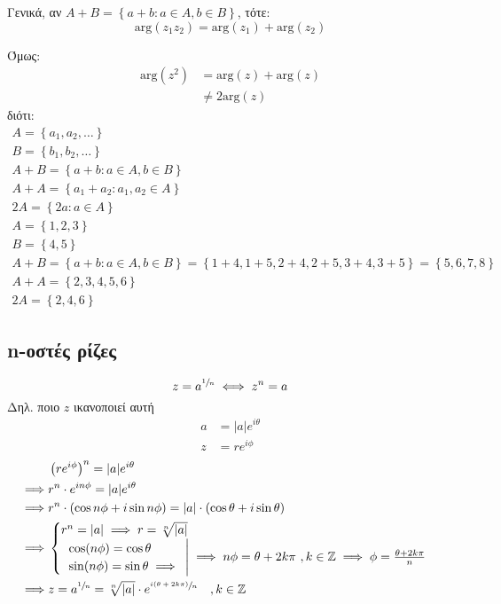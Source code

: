 \documentclass[12pt,a4paper,notitlepage,fleqn]{article}
\begin{document}
    Γενικά, αν \( A+B = \left\lbrace a+b: a \in A, b \in B \right\rbrace \), τότε:
    \[
    \mathrm{arg}(z_1z_2) = \mathrm{arg}(z_1) + \mathrm{arg}(z_2)
    \]

    Όμως:
    \begin{align*}
    \mathrm{arg}(z^2) &= \mathrm{arg}(z)+\mathrm{arg}(z) \\
    &\neq 2\mathrm{arg}(z)
    \end{align*}
    διότι:
    \begin{gather*}
    	A = \left\lbrace a_1,a_2,\dots \right\rbrace \\
    	B = \left\lbrace b_1,b_2,\dots \right\rbrace \\
    	A+B = \left\lbrace a+b: a\in A, b\in B \right\rbrace \\
    	A+A = \left\lbrace a_1+a_2:a_1,a_2\in A \right\rbrace \\
    	2A = \left\lbrace 2a:a\in A \right\rbrace \\[.3pt]
    	A = \left\lbrace 1,2,3 \right\rbrace \\
    	B = \left\lbrace 4,5 \right\rbrace \\
    	A+B = \left\lbrace a+b:a\in A, b\in B \right\rbrace
    	= \left\lbrace 1+4,1+5,2+4,2+5,3+4,3+5 \right\rbrace
    	= \left\lbrace 5,6,7,8 \right\rbrace\\
    	A+A = \left\lbrace 2,3,4,5,6 \right\rbrace \\
    	2A = \left\lbrace 2,4,6 \right\rbrace
    \end{gather*}


   	\subsection{n-οστές ρίζες}
   	\[
   	z = a^{\sfrac{1}{n}} \iff z^n=a
   	\]
   	Δηλ. ποιο \( z \) ικανοποιεί αυτή
   	\begin{align*}
   	a &= |a|e^{i\theta} \\
   	z &= re^{i\phi}
   	\end{align*}
   	\begin{align*}
   	& \left( re^{i\phi} \right)^n = |a|e^{i\theta} \\
   	\implies& r^n\cdot e ^{in\phi} = |a|e^{i\theta} \\
   	\implies& r^n\cdot(\cos n\phi+i\sin n\phi) = |a|\cdot(\cos\theta+i\sin\theta)\\
   	\implies& \begin{cases}
   	r^n=|a|\implies r =\sqrt[n]{|a|} \\
   	\left.\begin{array}{l}
   	\cos(n\phi)=\cos\theta \\
   	\sin(n\phi)=\sin\theta \implies
   	\end{array}\right| \implies
   	n\phi = \theta+2k\pi \ ,k\in\mathbb Z \implies \phi=\frac{\theta+2k\pi}{n}
   	\end{cases} \\
   	\implies& z=a^{\sfrac{1}{n}} = \sqrt[n]{|a|}\cdot
   	e^{\sfrac{i(\theta+2k\pi)}{n}} \quad ,k\in\mathbb Z
   	\end{align*}
\end{document}
